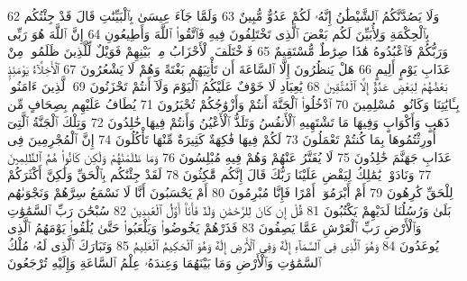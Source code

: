 {\tiny\colorbox{cl_aya}{62}} وَلَا يَصُدَّنَّكُمُ ٱلشَّيْطَٰنُ إِنَّهُۥ لَكُمْ عَدُوٌّ مُّبِينٌ
{\tiny\colorbox{cl_aya}{63}} وَلَمَّا جَآءَ عِيسَىٰ بِٱلْبَيِّنَٰتِ قَالَ قَدْ جِئْتُكُم بِٱلْحِكْمَةِ وَلِأُبَيِّنَ لَكُم بَعْضَ ٱلَّذِى تَخْتَلِفُونَ فِيهِ فَٱتَّقُوا۟ ٱللَّهَ وَأَطِيعُونِ
{\tiny\colorbox{cl_aya}{64}} إِنَّ ٱللَّهَ هُوَ رَبِّى وَرَبُّكُمْ فَٱعْبُدُوهُ هَٰذَا صِرَٰطٌ مُّسْتَقِيمٌ
{\tiny\colorbox{cl_aya}{65}} فَٱخْتَلَفَ ٱلْأَحْزَابُ مِنۢ بَيْنِهِمْ فَوَيْلٌ لِّلَّذِينَ ظَلَمُوا۟ مِنْ عَذَابِ يَوْمٍ أَلِيمٍ
{\tiny\colorbox{cl_aya}{66}} هَلْ يَنظُرُونَ إِلَّا ٱلسَّاعَةَ أَن تَأْتِيَهُم بَغْتَةً وَهُمْ لَا يَشْعُرُونَ
{\tiny\colorbox{cl_aya}{67}} ٱلْأَخِلَّآءُ يَوْمَئِذٍۭ بَعْضُهُمْ لِبَعْضٍ عَدُوٌّ إِلَّا ٱلْمُتَّقِينَ
{\tiny\colorbox{cl_aya}{68}} يَٰعِبَادِ لَا خَوْفٌ عَلَيْكُمُ ٱلْيَوْمَ وَلَآ أَنتُمْ تَحْزَنُونَ
{\tiny\colorbox{cl_aya}{69}} ٱلَّذِينَ ءَامَنُوا۟ بِـَٔايَٰتِنَا وَكَانُوا۟ مُسْلِمِينَ
{\tiny\colorbox{cl_aya}{70}} ٱدْخُلُوا۟ ٱلْجَنَّةَ أَنتُمْ وَأَزْوَٰجُكُمْ تُحْبَرُونَ
{\tiny\colorbox{cl_aya}{71}} يُطَافُ عَلَيْهِم بِصِحَافٍ مِّن ذَهَبٍ وَأَكْوَابٍ وَفِيهَا مَا تَشْتَهِيهِ ٱلْأَنفُسُ وَتَلَذُّ ٱلْأَعْيُنُ وَأَنتُمْ فِيهَا خَٰلِدُونَ
{\tiny\colorbox{cl_aya}{72}} وَتِلْكَ ٱلْجَنَّةُ ٱلَّتِىٓ أُورِثْتُمُوهَا بِمَا كُنتُمْ تَعْمَلُونَ
{\tiny\colorbox{cl_aya}{73}} لَكُمْ فِيهَا فَٰكِهَةٌ كَثِيرَةٌ مِّنْهَا تَأْكُلُونَ
{\tiny\colorbox{cl_aya}{74}} إِنَّ ٱلْمُجْرِمِينَ فِى عَذَابِ جَهَنَّمَ خَٰلِدُونَ
{\tiny\colorbox{cl_aya}{75}} لَا يُفَتَّرُ عَنْهُمْ وَهُمْ فِيهِ مُبْلِسُونَ
{\tiny\colorbox{cl_aya}{76}} وَمَا ظَلَمْنَٰهُمْ وَلَٰكِن كَانُوا۟ هُمُ ٱلظَّٰلِمِينَ
{\tiny\colorbox{cl_aya}{77}} وَنَادَوْا۟ يَٰمَٰلِكُ لِيَقْضِ عَلَيْنَا رَبُّكَ قَالَ إِنَّكُم مَّٰكِثُونَ
{\tiny\colorbox{cl_aya}{78}} لَقَدْ جِئْنَٰكُم بِٱلْحَقِّ وَلَٰكِنَّ أَكْثَرَكُمْ لِلْحَقِّ كَٰرِهُونَ
{\tiny\colorbox{cl_aya}{79}} أَمْ أَبْرَمُوٓا۟ أَمْرًا فَإِنَّا مُبْرِمُونَ
{\tiny\colorbox{cl_aya}{80}} أَمْ يَحْسَبُونَ أَنَّا لَا نَسْمَعُ سِرَّهُمْ وَنَجْوَىٰهُم بَلَىٰ وَرُسُلُنَا لَدَيْهِمْ يَكْتُبُونَ
{\tiny\colorbox{cl_aya}{81}} قُلْ إِن كَانَ لِلرَّحْمَٰنِ وَلَدٌ فَأَنَا۠ أَوَّلُ ٱلْعَٰبِدِينَ
{\tiny\colorbox{cl_aya}{82}} سُبْحَٰنَ رَبِّ ٱلسَّمَٰوَٰتِ وَٱلْأَرْضِ رَبِّ ٱلْعَرْشِ عَمَّا يَصِفُونَ
{\tiny\colorbox{cl_aya}{83}} فَذَرْهُمْ يَخُوضُوا۟ وَيَلْعَبُوا۟ حَتَّىٰ يُلَٰقُوا۟ يَوْمَهُمُ ٱلَّذِى يُوعَدُونَ
{\tiny\colorbox{cl_aya}{84}} وَهُوَ ٱلَّذِى فِى ٱلسَّمَآءِ إِلَٰهٌ وَفِى ٱلْأَرْضِ إِلَٰهٌ وَهُوَ ٱلْحَكِيمُ ٱلْعَلِيمُ
{\tiny\colorbox{cl_aya}{85}} وَتَبَارَكَ ٱلَّذِى لَهُۥ مُلْكُ ٱلسَّمَٰوَٰتِ وَٱلْأَرْضِ وَمَا بَيْنَهُمَا وَعِندَهُۥ عِلْمُ ٱلسَّاعَةِ وَإِلَيْهِ تُرْجَعُونَ
